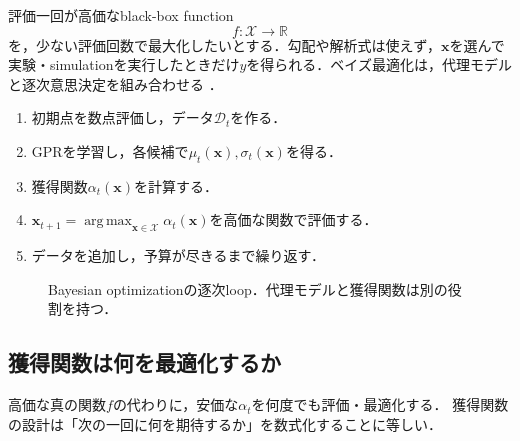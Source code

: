 \documentclass[a4paper,11pt]{ltjsarticle}
\newcommand{\R}{\mathbb R}
\newcommand{\D}{\mathcal D}
\newcommand{\argmax}{\operatorname*{arg\,max}}
\begin{document}
評価一回が高価なblack-box function
\begin{equation}
  f:\mathcal X\to\R
\end{equation}
を，少ない評価回数で最大化したいとする．勾配や解析式は使えず，\(\bm x\)を選んで
実験・simulationを実行したときだけ\(y\)を得られる．ベイズ最適化は，代理モデルと逐次意思決定を組み合わせる
\citep{jones1998ego,shahriari2016bo}．

\begin{enumerate}
  \item 初期点を数点評価し，データ\(\D_t\)を作る．
  \item GPRを学習し，各候補で\(\mu_t(\bm x),\sigma_t(\bm x)\)を得る．
  \item 獲得関数\(\alpha_t(\bm x)\)を計算する．
  \item \(\bm x_{t+1}=\argmax_{\bm x\in\mathcal X}\alpha_t(\bm x)\)を高価な関数で評価する．
  \item データを追加し，予算が尽きるまで繰り返す．
\end{enumerate}

\begin{figure}[H]
\centering
{}
\caption{Bayesian optimizationの逐次loop．代理モデルと獲得関数は別の役割を持つ．}
\label{fig:bo-loop}
\end{figure}

\subsection{獲得関数は何を最適化するか}

高価な真の関数\(f\)の代わりに，安価な\(\alpha_t\)を何度でも評価・最適化する．
獲得関数の設計は「次の一回に何を期待するか」を数式化することに等しい．
\end{document}

